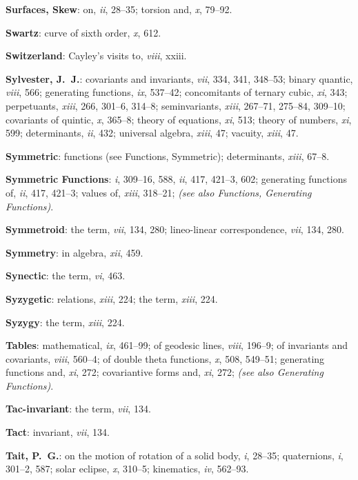 \documentclass[11pt,a4paper]{article}
\newcommand{\IndexEntry}[1]{\textbf{#1}}
\newcommand{\SeeAlso}[1]{\textit{(see also #1)}}
\newcommand{\V}[1]{\textit{#1}} %
\begin{document}
\IndexEntry{Surfaces, Skew}: on, \V{ii}, 28--35; torsion and, \V{x}, 79--92.

\IndexEntry{Swartz}: curve of sixth order, \V{x}, 612.

\IndexEntry{Switzerland}: Cayley's visits to, \V{viii}, xxiii.

\IndexEntry{Sylvester, J.\ J.}: covariants and invariants, \V{vii}, 334, 341, 348--53; binary quantic, \V{viii}, 566; generating functions, \V{ix}, 537--42; concomitants of ternary cubic, \V{xi}, 343; perpetuants, \V{xiii}, 266, 301--6, 314--8; seminvariants, \V{xiii}, 267--71, 275--84, 309--10; covariants of quintic, \V{x}, 365--8; theory of equations, \V{xi}, 513; theory of numbers, \V{xi}, 599; determinants, \V{ii}, 432; universal algebra, \V{xiii}, 47; vacuity, \V{xiii}, 47.

\IndexEntry{Symmetric}: functions (see Functions, Symmetric); determinants, \V{xiii}, 67--8.

\newpage

\setcounter{page}{126}

\IndexEntry{Symmetric Functions}: \V{i}, 309--16, 588, \V{ii}, 417, 421--3, 602; generating functions of, \V{ii}, 417, 421--3; values of, \V{xiii}, 318--21; \SeeAlso{Functions, Generating Functions}.

\IndexEntry{Symmetroid}: the term, \V{vii}, 134, 280; lineo-linear correspondence, \V{vii}, 134, 280.

\IndexEntry{Symmetry}: in algebra, \V{xii}, 459.

\IndexEntry{Synectic}: the term, \V{vi}, 463.

\IndexEntry{Syzygetic}: relations, \V{xiii}, 224; the term, \V{xiii}, 224.

\IndexEntry{Syzygy}: the term, \V{xiii}, 224.

\IndexEntry{Tables}: mathematical, \V{ix}, 461--99; of geodesic lines, \V{viii}, 196--9; of invariants and covariants, \V{viii}, 560--4; of double theta functions, \V{x}, 508, 549--51; generating functions and, \V{xi}, 272; covariantive forms and, \V{xi}, 272; \SeeAlso{Generating Functions}.

\IndexEntry{Tac-invariant}: the term, \V{vii}, 134.

\IndexEntry{Tact}: invariant, \V{vii}, 134.

\IndexEntry{Tait, P.\ G.}: on the motion of rotation of a solid body, \V{i}, 28--35; quaternions, \V{i}, 301--2, 587; solar eclipse, \V{x}, 310--5; kinematics, \V{iv}, 562--93.
\end{document}
